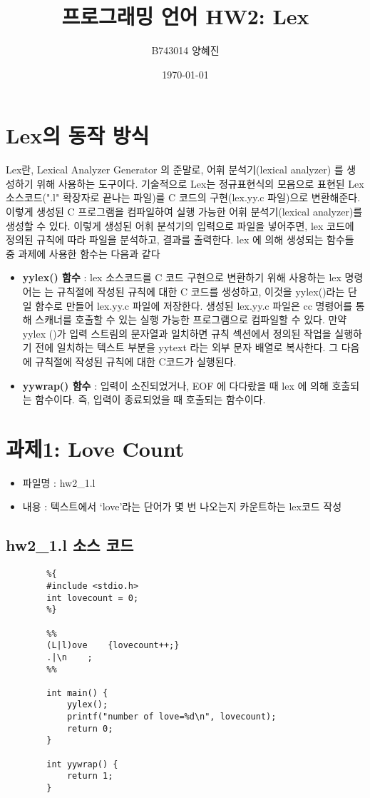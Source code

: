 \documentclass{article}
\begin{document}
\title{프로그래밍 언어 HW2: Lex}
\author{B743014 양혜진}
\date{\today}
\maketitle

\section{Lex의 동작 방식}
Lex란, Lexical Analyzer Generator 의 준말로, 어휘 분석기(lexical analyzer) 를 생성하기 위해
사용하는 도구이다. 기술적으로 Lex는 정규표현식의 모음으로 표현된 Lex 소스코드(".l" 확장자로 끝나는 파일)를
C 코드의 구현(lex.yy.c 파일)으로 변환해준다. 이렇게 생성된 C 프로그램을 컴파일하여 실행 가능한
어휘 분석기(lexical analyzer)를 생성할 수 있다. 이렇게 생성된 어휘 분석기의 입력으로
파일을 넣어주면, lex 코드에 정의된 규칙에 따라 파일을 분석하고, 결과를 출력한다.
lex 에 의해 생성되는 함수들 중 과제에 사용한 함수는 다음과 같다

\begin{itemize}
	\item {\bf yylex() 함수} : lex 소스코드를 C 코드 구현으로 변환하기 위해
	사용하는 lex 명령어는 는 규칙절에 작성된 규칙에 대한 C 코드를 생성하고, 이것을
	yylex()라는 단일 함수로 만들어 lex.yy.c 파일에 저장한다. 생성된
	lex.yy.c 파일은 cc 명령어를 통해 스캐너를 호출할 수 있는 실행 가능한
	프로그램으로 컴파일할 수 있다. 만약 yylex ()가 입력 스트림의 문자열과 일치하면 
	규칙 섹션에서 정의된 작업을 실행하기 전에 일치하는 텍스트 부분을 yytext 라는
	외부 문자 배열로 복사한다. 그 다음에 규칙절에 작성된 규칙에 대한 C코드가 실행된다.
	\item {\bf yywrap() 함수} : 입력이 소진되었거나, EOF 에 다다랐을 때
	lex 에 의해 호출되는 함수이다. 즉, 입력이 종료되었을 때 호출되는 함수이다.
\end{itemize}


\section{과제1: Love Count}

\begin{itemize}
	\item 파일명 : hw2\_1.l
	\item 내용 : 텍스트에서 ‘love’라는 단어가 몇 번 나오는지 카운트하는 lex코드 작성
\end{itemize}

\subsection{hw2\_1.l 소스 코드}
\begin{lstlisting}
		%{
		#include <stdio.h>
		int lovecount = 0;
		%}
		
		%%
		(L|l)ove	{lovecount++;}
		.|\n	;
		%%
		
		int main() {
			yylex();
			printf("number of love=%d\n", lovecount);
			return 0;
		}
		
		int yywrap() {
			return 1;
		}
\end{lstlisting}
\end{document}
